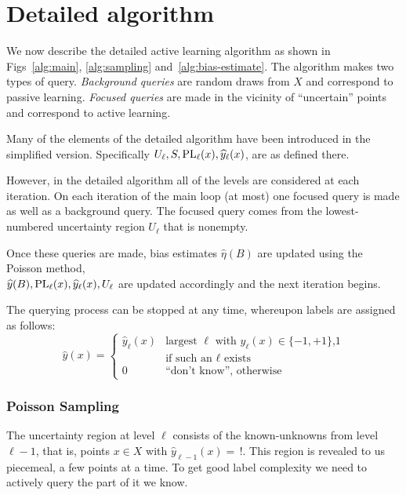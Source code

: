 \documentclass[twoside]{article}
\def\yh{{\widehat{y}}}
\def\PL{{\mbox{\rm PL}}}
\begin{document}
\section{Detailed algorithm}

We now describe the detailed active learning algorithm as shown in
Figs~\ref{alg:main}, \ref{alg:sampling} and~\ref{alg:bias-estimate}.
The algorithm makes two types of query. \emph{Background queries} are random draws
from $X$ and correspond to passive learning. \emph{Focused queries}
are made in the vicinity of ``uncertain'' points and correspond to
active learning.

Many of the elements of the detailed algorithm have been introduced in the simplified version.
Specifically $U_\ell,S,\PL_\ell(x),\yh_\ell(x)$, are as defined there.

However, in the detailed algorithm all of the levels are considered at each iteration.
On each iteration of the main loop (at most) one focused
query is made as well as a background query. The focused query comes
from the lowest-numbered uncertainty region $U_\ell$ that is nonempty.

Once these queries are made, bias estimates $\widehat{\eta}(B)$ are
updated using the Poisson method,\\
$\yh(B), \PL_\ell(x), \yh_\ell(x), U_\ell$ are updated
accordingly  and the next iteration begins.

The querying process can be stopped at any time, whereupon labels are assigned as follows:
\begin{equation}
\yh(x) = 
\left\{
\begin{array}{cl}
  \yh_\ell(x) & \mbox{largest $\ell$ with $\yh_\ell(x) \in \{-1,+1\}$,1}\\
  & \mbox{if such an $\ell$ exists} \\
0 & \mbox{``don't know'', otherwise}
\end{array}
\right.
\label{eq:final-label}
\end{equation}

\subsubsection{Poisson Sampling}
\label{sec:poisson}


The uncertainty region at level $\ell$ consists of the known-unknowns
from level $\ell-1$, that is, points $x \in X$ with
$\yh_{\ell-1}(x) = \, !$. This region is revealed to us piecemeal, a
few points at a time. To get good label complexity we need to actively
query the part of it we know.
\end{document}
